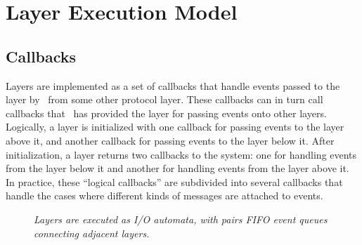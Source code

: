 %
%
%
\section{Layer Execution Model}

\subsection{Callbacks}
Layers are implemented as a set of callbacks that handle events passed to
the layer by \ensemble\ from some other protocol layer.  These callbacks can in
turn call callbacks that \ensemble\ has provided the layer for passing events
onto other layers.  Logically, a layer is initialized with one callback for
passing events to the layer above it, and another callback for passing
events to the layer below it.  After initialization, a layer returns two
callbacks to the system: one for handling events from the layer below it
and another for handling events from the layer above it.  In practice,
these ``logical callbacks'' are subdivided into several callbacks that
handle the cases where different kinds of messages are attached to events.

\begin{figure}[tb]
\begin{center}
\end{center}
\caption{\em Layers are executed as I/O automata, with pairs FIFO event
queues connecting adjacent layers.}
\label{fig:automata}
\end{figure}

